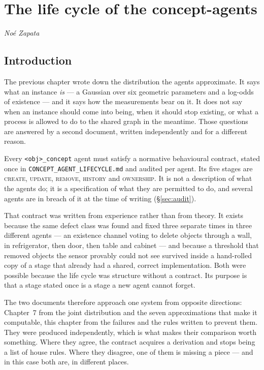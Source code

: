 \documentclass[11pt,a4paper]{report}
\newcommand{\stage}[1]{\textsc{#1}}
\newcommand{\Create}{\stage{create}}
\newcommand{\Update}{\stage{update}}
\newcommand{\Remove}{\stage{remove}}
\newcommand{\History}{\stage{history}}
\newcommand{\Ownership}{\stage{ownership}}
\begin{document}
\setcounter{chapter}{7}
\chapter{The life cycle of the concept-agents}

\begin{flushleft}
\textit{No\'e Zapata}
\end{flushleft}

\vspace{4pt}

\section{Introduction}
\label{sec:lc-intro}

The previous chapter wrote down the distribution the agents approximate. It says what an instance
\emph{is} --- a Gaussian over six geometric parameters and a log-odds of existence --- and it says
how the measurements bear on it. It does not say when an instance should come into being, when it
should stop existing, or what a process is allowed to do to the shared graph in the meantime. Those
questions are answered by a second document, written independently and for a different reason.

Every \texttt{<obj>\_concept} agent must satisfy a normative behavioural contract, stated once in
\texttt{CONCEPT\_\allowbreak AGENT\_\allowbreak LIFECYCLE.md} and audited per agent. Its five stages
are \Create, \Update, \Remove, \History{} and \Ownership. It is not a description of what the agents
do; it is a specification of what they are permitted to do, and several agents are in breach of it
at the time of writing (\S\ref{sec:audit}).

That contract was written from experience rather than from theory. It exists because the same defect
class was found and fixed three separate times in three different agents --- an existence channel
voting to delete objects through a wall, in \textsf{refrigerator}, then \textsf{door}, then
\textsf{table} and \textsf{cabinet} --- and because a threshold that removed objects the sensor
provably could not see survived inside a hand-rolled copy of a stage that already had a shared,
correct implementation. Both were possible because the life cycle was structure without a contract.
Its purpose is that a stage stated once is a stage a new agent cannot forget.

The two documents therefore approach one system from opposite directions: Chapter~7 from the joint
distribution and the seven approximations that make it computable, this chapter from the failures
and the rules written to prevent them. They were produced independently, which is what makes their
comparison worth something. Where they agree, the contract acquires a derivation and stops being a
list of house rules. Where they disagree, one of them is missing a piece --- and in this case both
are, in different places.
\end{document}

